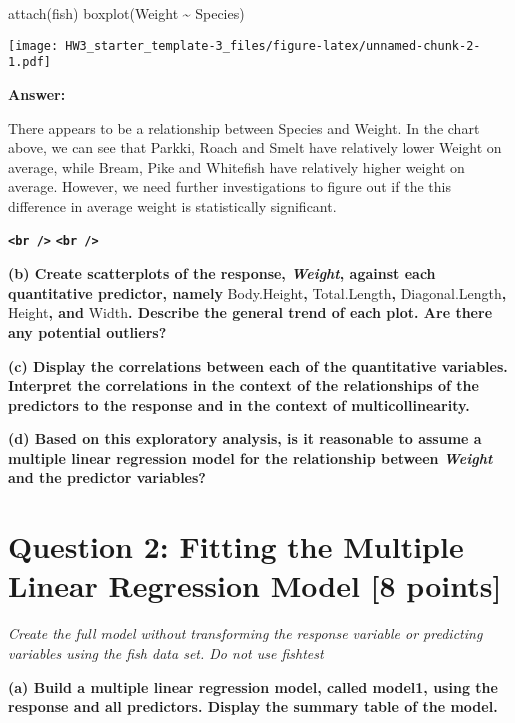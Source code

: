 \documentclass[
]{article}
\newenvironment{Shaded}{\begin{snugshade}}{\end{snugshade}}
\newcommand{\FunctionTok}[1]{\textcolor[rgb]{0.00,0.00,0.00}{#1}}
\newcommand{\NormalTok}[1]{#1}
\newcommand{\SpecialCharTok}[1]{\textcolor[rgb]{0.00,0.00,0.00}{#1}}
\begin{document}
\begin{Shaded}
\begin{Highlighting}[]
\FunctionTok{attach}\NormalTok{(fish)}
\FunctionTok{boxplot}\NormalTok{(Weight }\SpecialCharTok{\textasciitilde{}}\NormalTok{ Species)}
\end{Highlighting}
\end{Shaded}

\texttt{[image: HW3\_starter\_template-3\_files/figure-latex/unnamed-chunk-2-1.pdf]}

\textbf{Answer:}

There appears to be a relationship between Species and Weight. In the
chart above, we can see that Parkki, Roach and Smelt have relatively
lower Weight on average, while Bream, Pike and Whitefish have relatively
higher weight on average. However, we need further investigations to
figure out if the this difference in average weight is statistically
significant.

\textbf{\texttt{\textless{}br\ /\textgreater{}}}
\textbf{\texttt{\textless{}br\ /\textgreater{}}}

\textbf{(b) Create scatterplots of the response, \emph{Weight}, against
each quantitative predictor, namely} Body.Height\textbf{,}
Total.Length\textbf{,} Diagonal.Length\textbf{,} Height\textbf{, and}
Width\textbf{. Describe the general trend of each plot. Are there any
potential outliers?}

\textbf{(c) Display the correlations between each of the quantitative
variables. Interpret the correlations in the context of the
relationships of the predictors to the response and in the context of
multicollinearity.}

\textbf{(d) Based on this exploratory analysis, is it reasonable to
assume a multiple linear regression model for the relationship between
\emph{Weight} and the predictor variables?}

\hypertarget{question-2-fitting-the-multiple-linear-regression-model-8-points}{%
\section{Question 2: Fitting the Multiple Linear Regression Model {[}8
points{]}}\label{question-2-fitting-the-multiple-linear-regression-model-8-points}}

\emph{Create the full model without transforming the response variable
or predicting variables using the fish data set. Do not use fishtest}

\textbf{(a) Build a multiple linear regression model, called model1,
using the response and all predictors. Display the summary table of the
model.}
\end{document}
